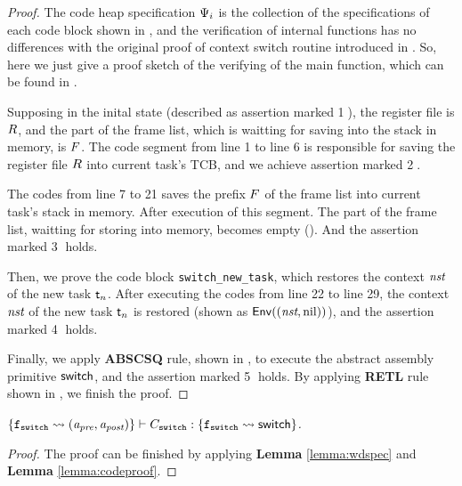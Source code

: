 \begin{proof}
    The code heap specification $\Psi_i$ is the collection of 
    the specifications of each code block shown in 
    \Fig{\ref{fig:Specifications of Internal Functions}}, and 
    the verification of internal functions has no differences with 
    the original proof of context switch routine introduced in 
    \Sec{\ref{sec:ctxswitch}}. So, here we just give a proof sketch 
    of the verifying of the main function, which can be found in 
    \Fig{\ref{fig:Proof Sketch of the Context Switch Routine}}. 

    Supposing in the inital state (described as assertion marked 
    {\color{red} \textcircled{1}}), 
    the register file is $R$, 
    and the part of the frame list, which is waitting for saving into 
    the stack in memory, is $F$. The code segment 
    from line 1 to line 6 is responsible for saving the register file  
    $R$ into current task's TCB, and we achieve assertion 
    marked {\color{red} \textcircled{2}}. 

    The codes from line 7 to 21 saves the prefix $F$ of the 
    frame list into current task's stack in memory. After execution 
    of this segment. The part of the frame list, waitting for storing 
    into memory, becomes empty (\nil). And the assertion marked
    {\color{red} \textcircled{3}} holds.  

    Then, we prove the code block \texttt{switch\_new\_task}, which 
    restores the context $\textit{nst}$ of the new task $\textsf{t}_n$. After 
    executing the codes from line 22 to line 29, the context $\textit{nst}$ of 
    the new task $\textsf{t}_n$ is restored (shown as $\mathsf{Env}({(\textit{nst}, \text{nil})})$), 
    and the assertion marked {\color{red} \textcircled{4}} holds. 

    Finally, we apply \textbf{ABSCSQ} rule, shown in 
    \Fig{\ref{fig:Selected Inference Rules for Refinement Verification}}, 
    to execute the abstract assembly primitive $\mathsf{switch}{}$, and the 
    assertion marked {\color{red} \textcircled{5}} holds. 
    By applying \textbf{RETL} rule shown in 
    \Fig{\ref{fig:Selected Inference Rules for Refinement Verification}}, 
    we finish the proof. 
\end{proof}

\begin{theorem}
    \em
    ${\{ \texttt{f}_{\texttt{switch}} \rightsquigarrow 
        (\textit{a}_\textit{pre}, \textit{a}_\textit{post}) \}} \vdash {C_{\texttt{switch}}} : {\{\texttt{f}_{\texttt{switch}}\rightsquigarrow \mathsf{switch}\}}$. 
\end{theorem}
\begin{proof}
    The proof can be finished by applying 
    \textbf{Lemma} \ref{lemma:wdspec} and 
    \textbf{Lemma} \ref{lemma:codeproof}.
\end{proof}